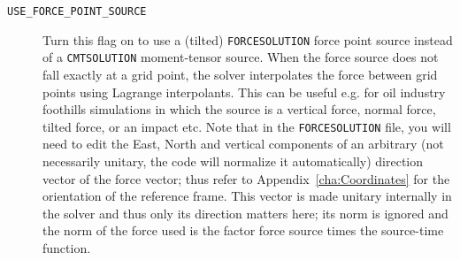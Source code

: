 \vspace{1cm}
\begin{description}
\item [{\texttt{USE\_FORCE\_POINT\_SOURCE}}] Turn this flag on to use a
(tilted) \texttt{FORCESOLUTION} force point source instead of a \texttt{CMTSOLUTION}
moment-tensor source. When the force source does not fall exactly
at a grid point, the solver interpolates the force between grid points
using Lagrange interpolants. This can be useful e.g. for oil industry
foothills simulations in which the source is a vertical force, normal
force, tilted force, or an impact etc. Note that in the \texttt{FORCESOLUTION}
file, you will need to edit the East, North and vertical components
of an arbitrary (not necessarily unitary, the code will normalize it automatically) direction vector of the force vector;
thus refer to Appendix~\ref{cha:Coordinates} for the orientation
of the reference frame. This vector is made unitary internally in
the solver and thus only its direction matters here; its norm is ignored
and the norm of the force used is the factor force source times the
source-time function.


\end{description}
